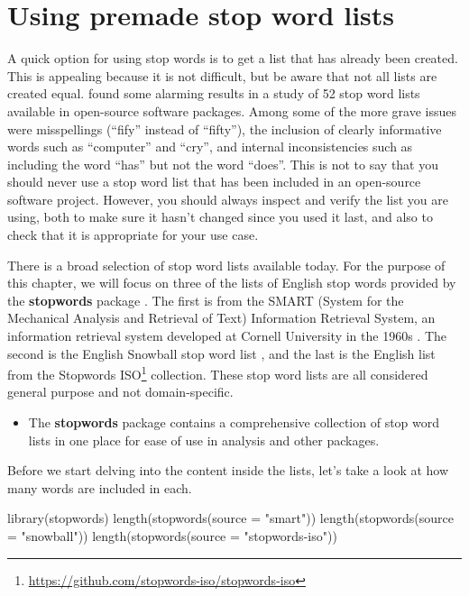 \documentclass[
]{krantz}
\makeatletter
\newenvironment{Shaded}{\begin{snugshade}}{\end{snugshade}}
\newcommand{\AttributeTok}[1]{\textcolor[rgb]{0.77,0.63,0.00}{#1}}
\newcommand{\FunctionTok}[1]{\textcolor[rgb]{0.00,0.00,0.00}{#1}}
\newcommand{\NormalTok}[1]{#1}
\newcommand{\StringTok}[1]{\textcolor[rgb]{0.31,0.60,0.02}{#1}}
\DeclareRobustCommand{\href}[2]{#2\footnote{\url{#1}}}
\renewcommand{\href}[2]{#2\footnote{\url{#1}}}
\newenvironment{kframe}{%
\medskip{}
\setlength{\fboxsep}{.8em}
 \def\at@end@of@kframe{}%
 \ifinner\ifhmode%
  \def\at@end@of@kframe{\end{minipage}}%
  \begin{minipage}{\columnwidth}%
 \fi\fi%
 \def\FrameCommand##1{\hskip\@totalleftmargin \hskip-\fboxsep
 \colorbox{shadecolor}{##1}\hskip-\fboxsep
     \hskip-\linewidth \hskip-\@totalleftmargin \hskip\columnwidth}%
 \MakeFramed {\advance\hsize-\width
   \@totalleftmargin\z@ \linewidth\hsize
   \@setminipage}}%
 {\par\unskip\endMakeFramed%
 \at@end@of@kframe}
\renewenvironment{Shaded}{\begin{kframe}}{\end{kframe}}
\newenvironment{rmdblock}[1]
  {\begin{shaded*}
  \begin{itemize}[left = -1cm, labelsep = 1cm]
  \renewcommand{\labelitemi}{
    \raisebox{-.7\height}[0pt][0pt]{
      {\setkeys{Gin}{width=3em,keepaspectratio}\texttt{[image: images/\#1]}}
    }
  }
 
  \item
  }
  {
  \end{itemize}
  \end{shaded*}
  }
\newenvironment{rmdpackage}
  {\begin{rmdblock}{package}}
  {\end{rmdblock}}
\makeatother
\begin{document}
\hypertarget{premadestopwords}{%
\section{Using premade stop word lists}\label{premadestopwords}}

A quick option for using stop words is to get a list that has already been created. This is appealing because it is not difficult, but be aware that not all lists are created equal. \citet{nothman-etal-2018-stop} found some alarming results in a study of 52 stop word lists available in open-source software packages. Among some of the more grave issues were misspellings (``fify'' instead of ``fifty''), the inclusion of clearly informative words such as ``computer'' and ``cry'', and internal inconsistencies such as including the word ``has'' but not the word ``does''. This is not to say that you should never use a stop word list that has been included in an open-source software project. However, you should always inspect and verify the list you are using, both to make sure it hasn't changed since you used it last, and also to check that it is appropriate for your use case.

There is a broad selection of stop word lists available today. For the purpose of this chapter, we will focus on three of the lists of English stop words provided by the \textbf{stopwords} package \citep{R-stopwords}. The first is from the SMART (System for the Mechanical Analysis and Retrieval of Text) Information Retrieval System, an information retrieval system developed at Cornell University in the 1960s \citep{Lewis2014}. The second is the English Snowball stop word list \citep{porter2001snowball}, and the last is the English list from the \href{https://github.com/stopwords-iso/stopwords-iso}{Stopwords ISO} collection. These stop word lists are all considered general purpose and not domain-specific.

\begin{rmdpackage}
The \textbf{stopwords} package contains a comprehensive collection of
stop word lists in one place for ease of use in analysis and other
packages.
\end{rmdpackage}

Before we start delving into the content inside the lists, let's take a look at how many words are included in each.

\begin{Shaded}
\begin{Highlighting}[]
\FunctionTok{library}\NormalTok{(stopwords)}
\FunctionTok{length}\NormalTok{(}\FunctionTok{stopwords}\NormalTok{(}\AttributeTok{source =} \StringTok{"smart"}\NormalTok{))}
\FunctionTok{length}\NormalTok{(}\FunctionTok{stopwords}\NormalTok{(}\AttributeTok{source =} \StringTok{"snowball"}\NormalTok{))}
\FunctionTok{length}\NormalTok{(}\FunctionTok{stopwords}\NormalTok{(}\AttributeTok{source =} \StringTok{"stopwords{-}iso"}\NormalTok{))}
\end{Highlighting}
\end{Shaded}
\end{document}
